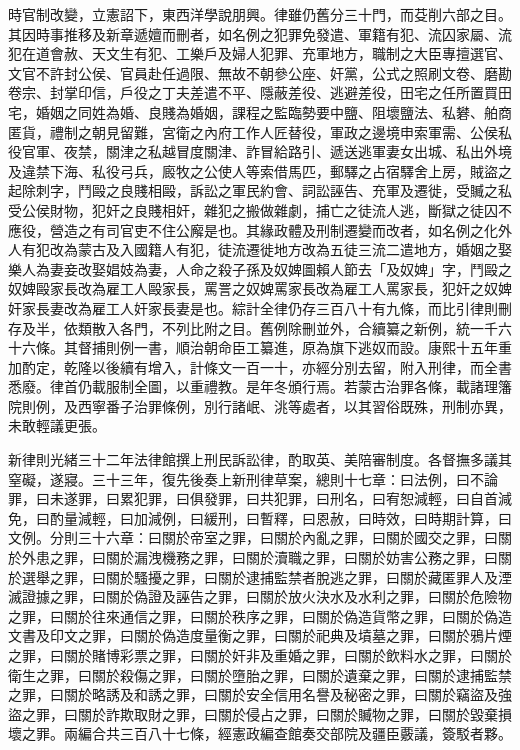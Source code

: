 \begin{pinyinscope}
時官制改變，立憲詔下，東西洋學說朋興。律雖仍舊分三十門，而芟削六部之目。其因時事推移及新章遞嬗而刪者，如名例之犯罪免發遣、軍籍有犯、流囚家屬、流犯在道會赦、天文生有犯、工樂戶及婦人犯罪、充軍地方，職制之大臣專擅選官、文官不許封公侯、官員赴任過限、無故不朝參公座、奸黨，公式之照刷文卷、磨勘卷宗、封掌印信，戶役之丁夫差遣不平、隱蔽差役、逃避差役，田宅之任所置買田宅，婚姻之同姓為婚、良賤為婚姻，課程之監臨勢要中鹽、阻壞鹽法、私礬、舶商匿貨，禮制之朝見留難，宮衛之內府工作人匠替役，軍政之邊境申索軍需、公侯私役官軍、夜禁，關津之私越冒度關津、詐冒給路引、遞送逃軍妻女出城、私出外境及違禁下海、私役弓兵，廄牧之公使人等索借馬匹，郵驛之占宿驛舍上房，賊盜之起除刺字，鬥毆之良賤相毆，訴訟之軍民約會、詞訟誣告、充軍及遷徙，受贓之私受公侯財物，犯奸之良賤相奸，雜犯之搬做雜劇，捕亡之徒流人逃，斷獄之徒囚不應役，營造之有司官吏不住公廨是也。其緣政體及刑制遷變而改者，如名例之化外人有犯改為蒙古及入國籍人有犯，徒流遷徙地方改為五徒三流二遣地方，婚姻之娶樂人為妻妾改娶娼妓為妻，人命之殺子孫及奴婢圖賴人節去「及奴婢」字，鬥毆之奴婢毆家長改為雇工人毆家長，罵詈之奴婢罵家長改為雇工人罵家長，犯奸之奴婢奸家長妻改為雇工人奸家長妻是也。綜計全律仍存三百八十有九條，而比引律則刪存及半，依類散入各門，不列比附之目。舊例除刪並外，合續纂之新例，統一千六十六條。其督捕則例一書，順治朝命臣工纂進，原為旗下逃奴而設。康熙十五年重加酌定，乾隆以後續有增入，計條文一百一十，亦經分別去留，附入刑律，而全書悉廢。律首仍載服制全圖，以重禮教。是年冬頒行焉。若蒙古治罪各條，載諸理籓院則例，及西寧番子治罪條例，別行諸岷、洮等處者，以其習俗既殊，刑制亦異，未敢輕議更張。

新律則光緒三十二年法律館撰上刑民訴訟律，酌取英、美陪審制度。各督撫多議其窒礙，遂寢。三十三年，復先後奏上新刑律草案，總則十七章：曰法例，曰不論罪，曰未遂罪，曰累犯罪，曰俱發罪，曰共犯罪，曰刑名，曰宥恕減輕，曰自首減免，曰酌量減輕，曰加減例，曰緩刑，曰暫釋，曰恩赦，曰時效，曰時期計算，曰文例。分則三十六章：曰關於帝室之罪，曰關於內亂之罪，曰關於國交之罪，曰關於外患之罪，曰關於漏洩機務之罪，曰關於瀆職之罪，曰關於妨害公務之罪，曰關於選舉之罪，曰關於騷擾之罪，曰關於逮捕監禁者脫逃之罪，曰關於藏匿罪人及湮滅證據之罪，曰關於偽證及誣告之罪，曰關於放火決水及水利之罪，曰關於危險物之罪，曰關於往來通信之罪，曰關於秩序之罪，曰關於偽造貨幣之罪，曰關於偽造文書及印文之罪，曰關於偽造度量衡之罪，曰關於祀典及墳墓之罪，曰關於鴉片煙之罪，曰關於賭博彩票之罪，曰關於奸非及重婚之罪，曰關於飲料水之罪，曰關於衛生之罪，曰關於殺傷之罪，曰關於墮胎之罪，曰關於遺棄之罪，曰關於逮捕監禁之罪，曰關於略誘及和誘之罪，曰關於安全信用名譽及秘密之罪，曰關於竊盜及強盜之罪，曰關於詐欺取財之罪，曰關於侵占之罪，曰關於贓物之罪，曰關於毀棄損壞之罪。兩編合共三百八十七條，經憲政編查館奏交部院及疆臣覈議，簽駁者夥。


\end{pinyinscope}
